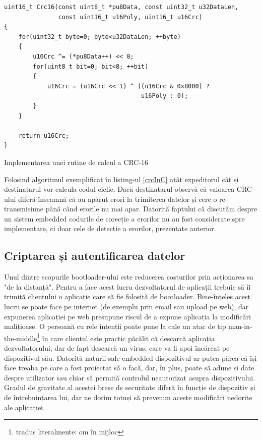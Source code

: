 \documentclass[12pt,a4paper,titlepage]{report}
\begin{document}
\begin{listing}[h]
\begin{verbatim}
uint16_t Crc16(const uint8_t *pu8Data, const uint32_t u32DataLen,
               const uint16_t u16Poly, uint16_t u16Crc)
{
    for(uint32_t byte=0; byte<u32DataLen; ++byte)
    {
        u16Crc ^= (*pu8Data++) << 8;
        for(uint8_t bit=0; bit<8; ++bit)
        {
            u16Crc = (u16Crc << 1) ^ ((u16Crc & 0x8000) ?
                                      u16Poly : 0);
        }
    }

    return u16Crc;
}
\end{verbatim}

\caption{Implementarea unei rutine de calcul a CRC-16}
\label{crcInC}
\end{listing}

Folosind algoritmul exemplificat în listing-ul \ref{crcInC} atât expeditorul cât și destinatarul vor calcula codul ciclic. Dacă destinatarul observă că valoarea CRC-ului diferă înseamnă că au apărut erori la trimiterea datelor și cere o re-transmisiune până când erorile nu mai apar. Datorită faptului că discutăm despre un sistem embedded codurile de corecție a erorilor nu au fost considerate spre implementare, ci doar cele de detecție a erorilor, prezentate anterior.

\subsection{Criptarea și autentificarea datelor}

Unul dintre scopurile bootloader-ului este reducerea costurilor prin acționarea sa "de la distanță". Pentru a face acest lucru dezvoltatorul de aplicații trebuie să îi trimită clientului o aplicație care să fie folosită de bootloader. Bine-înțeles acest lucru se poate face pe internet (de exemplu prin email sau upload pe web), dar expunerea aplicației pe web presupune riscul de a expune aplicația la modificări malițioase. O persoană cu rele intenții poate pune la cale un atac de tip man-in-the-middle\footnote{tradus literalmente: om în mijloc} în care clientul este practic păcălit că descarcă aplicația dezvoltatorului, dar de fapt descarcă un virus, care va fi apoi încărcat pe dispozitivul său. Datorită naturii sale embedded dispozitivul ar putea părea că își face treaba pe care a fost proiectat să o facă, dar, în plus, poate să adune și date despre utilizator sau chiar să permită controlul neautorizat asupra dispozitivului. Gradul de gravitate al acestei breșe de securitate diferă în funcție de dispozitiv și de întrebuințarea lui, dar ne dorim totuși să prevenim aceste modificări nedorite ale aplicației.
\end{document}
